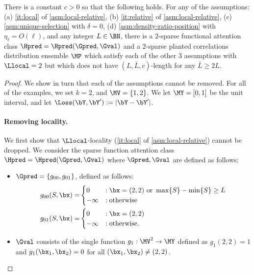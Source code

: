 \documentclass{article}
\begin{document}
\begin{proposition}
  \label{prop:necessity-asms}
There is a constant $c > 0$ so that the following holds. For any of the assumptions: (a) \cref{it:local} of \cref{asm:local-relative}, (b) \cref{it:relative} of \cref{asm:local-relative}, (c) \cref{asm:unique-selection} with $\delta = 0$, (d) \cref{asm:density-ratio-position} with $\eta_\ell = O(\ell)$, and any integer $L \in \BN$, there is a $2$-sparse functional attention class $\Hpred = \Hpred(\Gpred, \Gval)$ and a $2$-sparse planted correlations distribution ensemble $\MP$ which satisfy each of the other 3 assumptions with $\Llocal = 2$ but which does not have $(L, \bar L, c)$-length \generalization for any $\bar L \geq 2L$. 
\end{proposition}
\begin{proof}
  We show in turn that each of the assumptions cannot be removed. For all of the examples, we set $k = 2$, and $\MV = \{1,2\}$.  We let $\MY = [0,1]$ be the unit interval, and let $\Loss(\bY, \bY') := |\bY - \bY'|$.

  \paragraph{Removing locality.} We first show that $\Llocal$-locality (\cref{it:local} of \cref{asm:local-relative}) cannot be dropped.   We consider the sparse function attention class $\Hpred = \Hpred(\Gpred, \Gval)$ where $\Gpred, \Gval$ are defined as follows:
\begin{itemize}
\item $\Gpred= \{ g_{00}, g_{01} \}$, defined as follows:
  \begin{align}
    g_{00}(S, \bx) =& \begin{cases}
      0 &: \bx = (2,2) \mbox{ or } \max\{ S \} - \min\{ S \} \geq L \\
      -\infty &: \mbox{otherwise}
    \end{cases}\nonumber\\
    g_{01}(S, \bx) =& \begin{cases}
      0& : \bx = (2,2) \\
      -\infty &: \mbox{otherwise}.
      \end{cases}\nonumber
  \end{align}
\item $\Gval$ consists of the single function $g_1 : \MV^2 \to \MY$ defined as $g_1(2,2) = 1$ and $g_1(\bx_1, \bx_2) = 0$ for all $(\bx_1, \bx_2) \neq (2,2)$. 
\end{itemize}


\end{proof}
\end{document}
